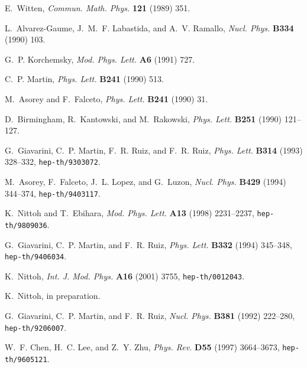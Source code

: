 \documentclass[a4paper,12pt]{article}
\begin{document}
%
\providecommand{\href}[2]{#2}\begingroup\raggedright\begin{thebibliography}{1}

E.~Witten,
{\em Commun. Math. Phys.} {\bf 121} (1989)
351.

L.~Alvarez-Gaume, J.~M.~F. Labastida, and A.~V. Ramallo,
{\em Nucl. Phys.} {\bf B334} (1990) 103.

G.~P. Korchemsky, 
{\em Mod. Phys. Lett.} {\bf A6} (1991) 727.

C.~P. Martin, 
{\em Phys. Lett.} {\bf B241} (1990) 513.

M.~Asorey and F.~Falceto,
  {\em Phys. Lett.} {\bf B241} (1990) 31.

D.~Birmingham, R.~Kantowski, and M.~Rakowski, 
{\em Phys. Lett.} {\bf B251} (1990) 121--127.

G.~Giavarini, C.~P. Martin, F.~R. Ruiz, and F.~R. Ruiz, 
{\em Phys. Lett.} {\bf B314} (1993) 328--332,
\href{http://www.arXiv.org/abs/hep-th/9303072}{{\tt hep-th/9303072}}.

M.~Asorey, F.~Falceto, J.~L. Lopez, and G.~Luzon,
{\em Nucl. Phys.} {\bf B429} (1994) 344--374,
\href{http://www.arXiv.org/abs/hep-th/9403117}{{\tt hep-th/9403117}}.

K.~Nittoh and T.~Ebihara,
{\em Mod. Phys. Lett.} {\bf A13} (1998) 2231--2237,
\href{http://www.arXiv.org/abs/hep-th/9809036}{{\tt hep-th/9809036}}.

G.~Giavarini, C.~P. Martin, and F.~R. Ruiz,
{\em Phys. Lett.} {\bf B332} (1994) 345--348,
\href{http://www.arXiv.org/abs/hep-th/9406034}{{\tt hep-th/9406034}}.

K.~Nittoh,
{\em Int. J. Mod. Phys.} {\bf A16} (2001) 3755,
\href{http://www.arXiv.org/abs/hep-th/0012043}{{\tt hep-th/0012043}}.

K.~Nittoh, in preparation.

G.~Giavarini, C.~P. Martin, and F.~R. Ruiz, 
{\em Nucl. Phys.} {\bf B381} (1992) 222--280,
\href{http://www.arXiv.org/abs/hep-th/9206007}{{\tt hep-th/9206007}}.

W.~F. Chen, H.~C. Lee, and Z.~Y. Zhu, 
{\em Phys. Rev.} {\bf D55} (1997) 3664--3673,
\href{http://www.arXiv.org/abs/hep-th/9605121}{{\tt hep-th/9605121}}.

\end{thebibliography}\endgroup
\end{document}
